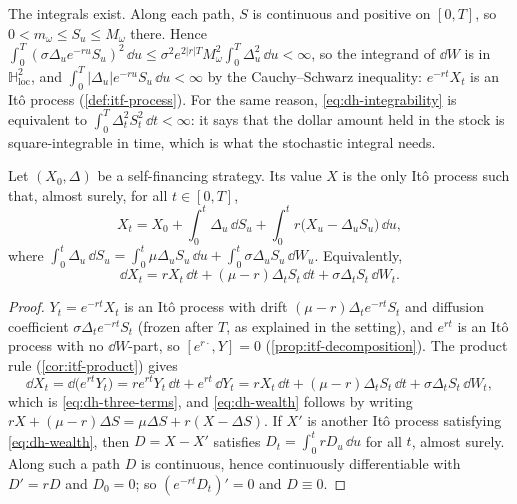 The integrals exist. Along each path, $S$ is continuous and positive on $[0,T]$, so
$0<m_\omega\le S_u\le M_\omega$ there. Hence
$\int_0^T(\sigma\Delta_ue^{-ru}S_u)^2\,\dd u\le\sigma^2e^{2|r|T}M_\omega^2\int_0^T\Delta_u^2\,\dd u<\infty$,
so the integrand of $\dd W$ is in $\mathbb H^2_{\mathrm{loc}}$, and
$\int_0^T|\Delta_u|e^{-ru}S_u\,\dd u<\infty$ by the Cauchy--Schwarz inequality: $e^{-rt}X_t$ is an
It\^o process (\cref{def:itf-process}). For the same reason, \eqref{eq:dh-integrability} is
equivalent to $\int_0^T\Delta_t^2S_t^2\,\dd t<\infty$: it says that the dollar amount held in
the stock is square-integrable in time, which is what the stochastic integral needs.

\begin{lemma}\label{lem:dh-wealth}
Let $(X_0,\Delta)$ be a self-financing strategy. Its value $X$ is the only It\^o process such
that, almost surely, for all $t\in[0,T]$,
\begin{equation}\label{eq:dh-wealth}
  X_t=X_0+\int_0^t\Delta_u\,\dd S_u+\int_0^tr\big(X_u-\Delta_uS_u\big)\,\dd u,
\end{equation}
where $\int_0^t\Delta_u\,\dd S_u=\int_0^t\mu\Delta_uS_u\,\dd u+\int_0^t\sigma\Delta_uS_u\,\dd W_u$.
Equivalently,
\begin{equation}\label{eq:dh-three-terms}
  \dd X_t=rX_t\,\dd t+(\mu-r)\Delta_tS_t\,\dd t+\sigma\Delta_tS_t\,\dd W_t .
\end{equation}
\end{lemma}

\begin{proof}
$Y_t=e^{-rt}X_t$ is an It\^o process with drift $(\mu-r)\Delta_te^{-rt}S_t$ and diffusion
coefficient $\sigma\Delta_te^{-rt}S_t$ (frozen after $T$, as explained in the setting), and $e^{rt}$
is an It\^o process with no $\dd W$-part, so
$[e^{r\cdot},Y]=0$ (\cref{prop:itf-decomposition}). The product rule (\cref{cor:itf-product})
gives
\[
  \dd X_t=\dd\big(e^{rt}Y_t\big)=re^{rt}Y_t\,\dd t+e^{rt}\,\dd Y_t
  =rX_t\,\dd t+(\mu-r)\Delta_tS_t\,\dd t+\sigma\Delta_tS_t\,\dd W_t ,
\]
which is \eqref{eq:dh-three-terms}, and \eqref{eq:dh-wealth} follows by writing
$rX+(\mu-r)\Delta S=\mu\Delta S+r(X-\Delta S)$. If $X'$ is another It\^o process satisfying
\eqref{eq:dh-wealth}, then $D=X-X'$ satisfies $D_t=\int_0^trD_u\,\dd u$ for all $t$, almost
surely. Along such a path $D$ is continuous, hence continuously differentiable with $D'=rD$
and $D_0=0$; so $(e^{-rt}D_t)'=0$ and $D\equiv0$.
\end{proof}


